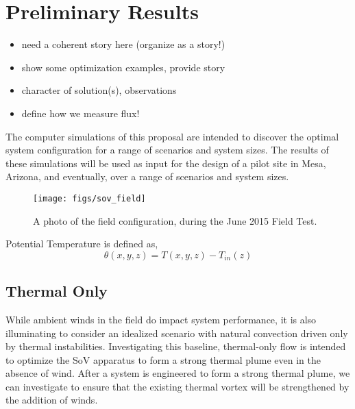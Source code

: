  
\section{Preliminary Results}
\label{sec:results}

\begin{itemize}
\item need a coherent story here (organize as a story!)
\item show some optimization examples, provide story
\item character of solution(s), observations
\item define how we measure flux!
\end{itemize}



The computer simulations of this proposal are intended to discover the
optimal system configuration for a range of scenarios and system
sizes. The results of these simulations will be used as input for the
design of a pilot site in Mesa, Arizona, and eventually, over a range of
scenarios and system sizes. 

  \begin{figure}[!htb]
   \begin{center}
    \texttt{[image: figs/sov\_field]}
    \caption{A photo of the field configuration, during the June 2015
    Field Test.}
    \label{fig:field_real}
   \end{center}
  \end{figure}

Potential Temperature is defined as,
\begin{equation}
  \theta(x,y,z) = T(x,y,z) -T_{in}(z) 
\end{equation}

\subsection{Thermal Only}

While ambient winds in the field do impact system performance, it is
also illuminating to consider an idealized scenario with natural convection
driven only by thermal instabilities. Investigating this baseline,
thermal-only flow is intended to optimize the SoV apparatus to form a
strong thermal plume even in the absence of wind. After a system is
engineered to form a strong thermal plume, we can investigate to ensure
that the existing thermal vortex will be strengthened by the addition of
winds.


